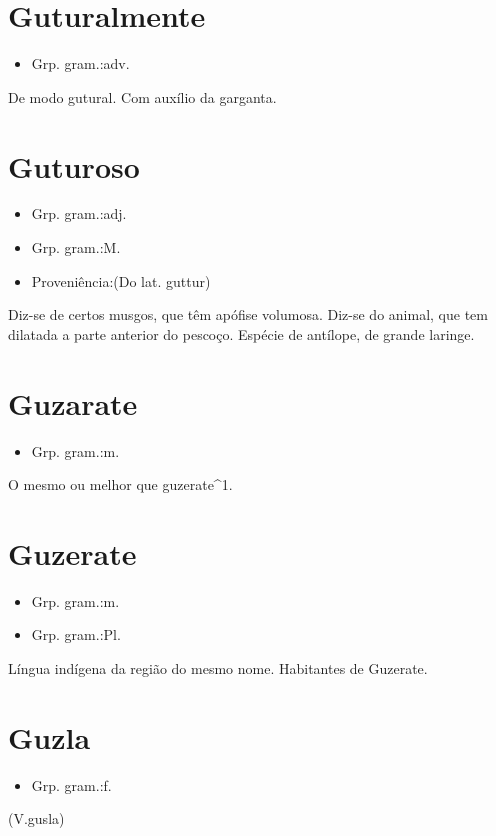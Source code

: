 \section{Guturalmente}
\begin{itemize}
\item {Grp. gram.:adv.}
\end{itemize}
De modo gutural.
Com auxílio da garganta.
\section{Guturoso}
\begin{itemize}
\item {Grp. gram.:adj.}
\end{itemize}
\begin{itemize}
\item {Grp. gram.:M.}
\end{itemize}
\begin{itemize}
\item {Proveniência:(Do lat. \textunderscore guttur\textunderscore )}
\end{itemize}
Diz-se de certos musgos, que têm apófise volumosa.
Diz-se do animal, que tem dilatada a parte anterior do pescoço.
Espécie de antílope, de grande laringe.
\section{Guzarate}
\begin{itemize}
\item {Grp. gram.:m.}
\end{itemize}
O mesmo ou melhor que \textunderscore guzerate\textunderscore ^1.
\section{Guzerate}
\begin{itemize}
\item {Grp. gram.:m.}
\end{itemize}
\begin{itemize}
\item {Grp. gram.:Pl.}
\end{itemize}
Língua indígena da região do mesmo nome.
Habitantes de Guzerate.
\section{Guzla}
\begin{itemize}
\item {Grp. gram.:f.}
\end{itemize}
(V.gusla)
